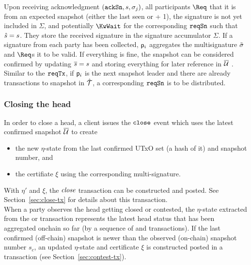 \quad Upon receiving acknowledgment $(\mathtt{ackSn},s,\sigma_j)$,
all participants $\Req$ that it is from an expected snapshot (either the last
seen or + 1), the signature is not yet included in $\Sigma$, and potentially
$\KwWait$ for the corresponding $\mathtt{reqSn}$ such that $\hat s = s$. They store the
received signature in the signature accumulator $\Sigma$. If a signature from
each party has been collected, $\mathsf p_i$ aggregates the multisignature
$\tilde \sigma$ and $\Req$s it to be valid.  If
everything is fine, the snapshot can be considered confirmed by updating
$\overline s=s$ and storing everything for later reference in $\overline {\mathcal U}$ . Similar to the $\mathtt{reqTx}$, if $\mathsf p_i$ is the next snapshot leader and there are already transactions to snapshot in $\hat {\mathcal T}$, a corresponding $\mathtt{reqSn}$ is to be distributed.

\subsubsection{Closing the head}

\quad In order to close a head, a client issues the
$\mathtt{close}$ event which uses the latest confirmed snapshot $\overline {\mathcal U}$ to create
\begin{itemize}
  \item the new $\eta$-state from the last confirmed UTxO set (a hash of it) and
        snapshot number, and
  \item the certifiate $\xi$ using the corresponding multi-signature.
\end{itemize}
With $\eta'$ and $\xi$, the $\textit{close}$ transaction can be constructed and
posted. See Section~\ref{sec:close-tx} for details about this transaction.
\\

\quad When a party observes
the head getting closed or contested, the $\eta$-state extracted from the
\mtxClose{} or \mtxContest{} transaction represents the latest head status that
has been aggregated onchain so far (by a sequence of \mtxClose{} and
\mtxContest{} transactions). If the last confirmed (off-chain) snapshot is newer
than the observed (on-chain) snapshot number $s_{c}$, an updated $\eta$-state
and certificate $\xi$ is constructed posted in a \mtxContest{} transaction (see
Section~\ref{sec:contest-tx}).



